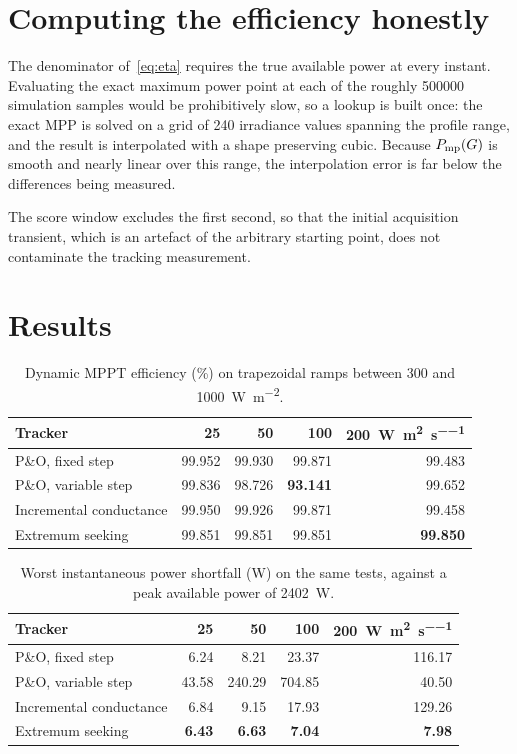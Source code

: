 \section{Computing the efficiency honestly}

The denominator of~\eqref{eq:eta} requires the true available power at every
instant. Evaluating the exact maximum power point at each of the roughly
\num{500000} simulation samples would be prohibitively slow, so a lookup is
built once: the exact MPP is solved on a grid of \num{240} irradiance values
spanning the profile range, and the result is interpolated with a shape
preserving cubic. Because $P_{\mathrm{mp}}(G)$ is smooth and nearly linear over this range,
the interpolation error is far below the differences being measured.

The score window excludes the first second, so that the initial acquisition
transient, which is an artefact of the arbitrary starting point, does not
contaminate the tracking measurement.

\section{Results}

\begin{table}[htbp]
\centering
\caption{Dynamic MPPT efficiency (\si{\percent}) on trapezoidal ramps between \SI{300}{} and \SI{1000}{\watt\per\square\metre}.}
\label{tab:dyneta}
\begin{tabular}{@{}lrrrr@{}}
\toprule
\textbf{Tracker} & \SI{25}{} & \SI{50}{} & \SI{100}{} & \SI{200}{\watt\per\square\metre\per\second} \\
\midrule
P\&O, fixed step        & 99.952 & 99.930 & 99.871 & 99.483 \\
P\&O, variable step     & 99.836 & 98.726 & \textbf{93.141} & 99.652 \\
Incremental conductance & 99.950 & 99.926 & 99.871 & 99.458 \\
Extremum seeking        & 99.851 & 99.851 & 99.851 & \textbf{99.850} \\
\bottomrule
\end{tabular}
\end{table}

\begin{table}[htbp]
\centering
\caption{Worst instantaneous power shortfall (\si{\watt}) on the same tests, against a peak available power of \SI{2402}{\watt}.}
\label{tab:dyndef}
\begin{tabular}{@{}lrrrr@{}}
\toprule
\textbf{Tracker} & \SI{25}{} & \SI{50}{} & \SI{100}{} & \SI{200}{\watt\per\square\metre\per\second} \\
\midrule
P\&O, fixed step        & 6.24  & 8.21   & 23.37  & 116.17 \\
P\&O, variable step     & 43.58 & 240.29 & 704.85 & 40.50 \\
Incremental conductance & 6.84  & 9.15   & 17.93  & 129.26 \\
Extremum seeking        & \textbf{6.43} & \textbf{6.63} & \textbf{7.04} & \textbf{7.98} \\
\bottomrule
\end{tabular}
\end{table}

